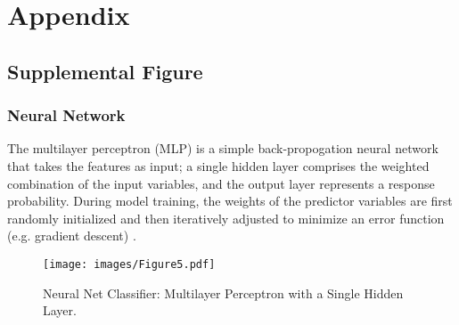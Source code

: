 \documentclass[sigconf]{acmart}
\begin{document}
\appendix

\section{Appendix}

\subsection{Supplemental Figure}

\subsubsection{Neural Network} The multilayer perceptron (MLP) is a simple
back-propogation neural network that takes the features as input; a single 
hidden layer comprises the weighted combination of the input variables, and 
the output layer represents a response probability. During model training, 
the weights of the predictor variables are first randomly initialized and 
then iteratively adjusted to minimize an error function (e.g. gradient 
descent) \cite{brown12}.

\begin{figure}[!ht]
  \centering\texttt{[image: images/Figure5.pdf]}
  \caption{Neural Net Classifier: Multilayer Perceptron with a Single Hidden Layer.}
  \label{f:Figure5}
\end{figure}
\end{document}
